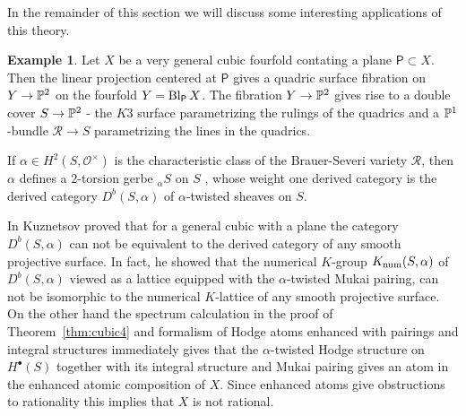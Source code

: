 \documentclass[twoside,leqno]{article}
\numberwithin{equation}{section}
\theoremstyle{plain}
\theoremstyle{definition}
\newtheorem{example}[equation]{Example}
\begin{document}
\medskip

In the remainder of this section we will discuss some interesting applications of this theory.

\begin{example} \label{ex:cubic+plane}  Let $X$ be a  very general cubic
fourfold contating a plane $\mathsf{P} \subset X$. Then
the linear projection centered at $\mathsf{P}$ gives a quadric
  surface fibration on $Y \to \mathbb P^2$ on the fourfold $Y =
  \operatorname{Bl}_{\mathsf{P}}X$. The fibration $Y \to \mathbb P^2$ gives rise to
a double cover $S \to \mathbb P^2$ - the $K3$ surface
parametrizing the rulings of the quadrics and a $\mathbb P^1$-bundle $\mathcal{R} \to S$ parametrizing the  lines in the quadrics.

If $\alpha \in H^2(S,\mathcal{O}^{\times})$ is the characteristic
class of the Brauer-Severi variety $\mathcal{R}$, then $\alpha$ defines a $2$-torsion gerbe ${}_{\alpha}S$ on $S$ , whose weight one derived category is the derived category $D^{b}(S,\alpha)$ of $\alpha$-twisted sheaves on $S$. 

In \cite{Kuznetsov-cubic4fold} Kuznetsov proved that for a general cubic with a plane the category $D^{b}(S,\alpha)$ can not be equivalent to the derived category of any smooth projective surface. In fact, he showed 
that the numerical $K$-group $K_{\operatorname{num}}(S,\alpha)$ of  $D^{b}(S,\alpha)$ viewed as a lattice equipped with the $\alpha$-twisted Mukai pairing, can not be isomorphic to the numerical $K$-lattice of any smooth projective surface. On the other hand the spectrum calculation in the proof of Theorem~\ref{thm:cubic4} and formalism of Hodge atoms enhanced with pairings and integral structures immediately gives  that the $\alpha$-twisted Hodge structure on $H^{\bullet}(S)$ together with its integral structure and Mukai pairing gives an atom in the enhanced atomic composition of $X$. Since enhanced atoms give obstructions to rationality this implies that $X$ is not rational.
\end{example}
\end{document}
